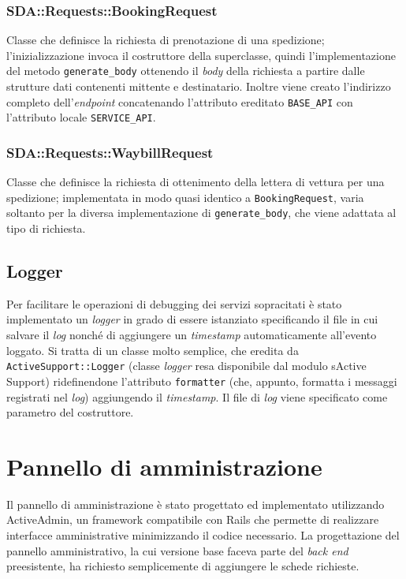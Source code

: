 \subsubsection{SDA::Requests::BookingRequest}
Classe che definisce la richiesta di prenotazione di una spedizione; l'inizializzazione invoca il costruttore della superclasse, quindi l'implementazione del metodo \texttt{generate\_body} ottenendo il \textit{body} della richiesta a partire dalle strutture dati contenenti mittente e destinatario. Inoltre viene creato l'indirizzo completo dell'\textit{endpoint} concatenando l'attributo ereditato \texttt{BASE\_API} con l'attributo locale \texttt{SERVICE\_API}.

\subsubsection{SDA::Requests::WaybillRequest}
Classe che definisce la richiesta di ottenimento della lettera di vettura per una spedizione; implementata in modo quasi identico a \texttt{BookingRequest}, varia soltanto per la diversa implementazione di \texttt{generate\_body}, che viene adattata al tipo di richiesta.

\subsection{Logger}
Per facilitare le operazioni di debugging dei servizi sopracitati è stato implementato un \textit{logger} in grado di essere istanziato specificando il file in cui salvare il \textit{log} nonché di aggiungere un \textit{timestamp} automaticamente all'evento loggato. Si tratta di un classe molto semplice, che eredita da \texttt{ActiveSupport::Logger} (classe \textit{logger} resa disponibile dal modulo sActive Support) ridefinendone l'attributo \texttt{formatter} (che, appunto, formatta i messaggi registrati nel \textit{log}) aggiungendo il \textit{timestamp}. Il file di \textit{log} viene specificato come parametro del costruttore.

\section{Pannello di amministrazione}
Il pannello di amministrazione è stato progettato ed implementato utilizzando ActiveAdmin, un framework compatibile con Rails che permette di realizzare interfacce amministrative minimizzando il codice necessario.
La progettazione del pannello amministrativo, la cui versione base faceva parte del \textit{back end} preesistente, ha richiesto semplicemente di aggiungere le schede richieste.
